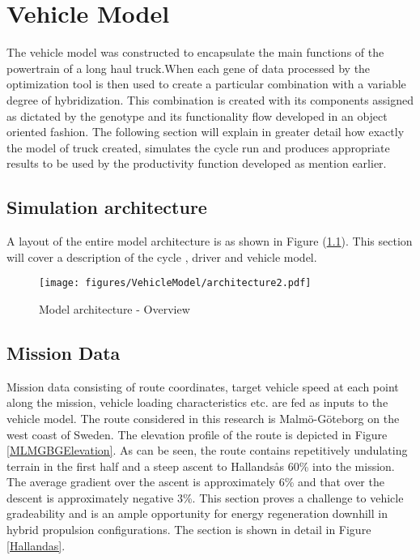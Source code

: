 \documentclass[MastersThesis.tex]{subfiles}
\begin{document}
\chapter{Vehicle Model}
The vehicle model was constructed to encapsulate the main functions of the powertrain of a long haul truck.When each gene of data processed by the optimization tool is then used to create a particular combination with a variable degree of hybridization. This combination is created with its components assigned as dictated by the genotype and its functionality flow developed in an object oriented fashion. The following section will explain in greater detail how exactly the model of truck created, simulates the cycle run and produces appropriate results to be used by the productivity function developed as mention earlier.  

\section{Simulation architecture}

A layout of the entire model architecture is as shown in Figure (\ref{fig:architecture}). This section will cover a description of the cycle , driver and vehicle model. 

\begin{figure}[H]
	\begin{center}
		\texttt{[image: figures/VehicleModel/architecture2.pdf]}
	\end{center}
	\caption{Model architecture - Overview}
	\label{fig:architecture}
\end{figure}

\section{Mission Data}
Mission data consisting of route coordinates, target vehicle speed at each point along the mission, vehicle loading characteristics etc. are fed as inputs to the vehicle model. The route considered in this research is Malm\"o-G\"oteborg on the west coast of Sweden. The elevation profile of the route is depicted in Figure \ref{MLMGBGElevation}. As can be seen, the route contains repetitively undulating terrain in the first half and a steep ascent to Hallands\aa s 60\% into the mission. The average gradient over the ascent is approximately 6\% and that over the descent is approximately negative 3\%. This section proves a challenge to vehicle gradeability and is an ample opportunity for energy regeneration downhill in hybrid propulsion configurations. The section is shown in detail in Figure \ref{Hallandas}.\\ 
\end{document}
